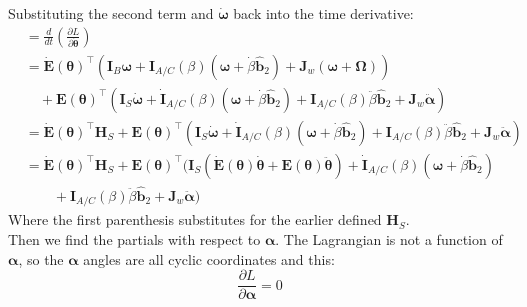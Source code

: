 \documentclass[titlepage]{article}
\begin{document}
Substituting the second term and $\dot{\boldsymbol{\omega}}$ back into the time derivative:
\begin{equation}
	\begin{split}
		&=\frac{d}{dt}\left(\frac{\partial L}{\partial\dot{\boldsymbol{\theta}}}\right) \\
		&=\dot{\boldsymbol{E}}(\boldsymbol{\theta})^\top\left(\boldsymbol{I}_B\boldsymbol{\omega}+\boldsymbol{I}_{A/C}(\beta)\left(\boldsymbol{\omega}+\dot{\beta}\hat{\boldsymbol{b}}_2\right)+\boldsymbol{J}_w\left(\boldsymbol{\omega}+\boldsymbol{\Omega}\right)\right) \\
		&\quad+\boldsymbol{E}(\boldsymbol{\theta})^\top\left(\boldsymbol{I}_S\dot{\boldsymbol{\omega}}+\dot{\boldsymbol{I}}_{A/C}(\beta)\left(\boldsymbol{\omega}+\dot{\beta}\hat{\boldsymbol{b}}_2\right)+\boldsymbol{I}_{A/C}(\beta)\ddot{\beta}\hat{\boldsymbol{b}}_2+\boldsymbol{J}_w\ddot{\boldsymbol{\alpha}}\right) \\
		&=\dot{\boldsymbol{E}}(\boldsymbol{\theta})^\top\boldsymbol{H}_S+\boldsymbol{E}(\boldsymbol{\theta})^\top\left(\boldsymbol{I}_S\dot{\boldsymbol{\omega}}+\dot{\boldsymbol{I}}_{A/C}(\beta)\left(\boldsymbol{\omega}+\dot{\beta}\hat{\boldsymbol{b}}_2\right)+\boldsymbol{I}_{A/C}(\beta)\ddot{\beta}\hat{\boldsymbol{b}}_2+\boldsymbol{J}_w\ddot{\boldsymbol{\alpha}}\right) \\
		&=\dot{\boldsymbol{E}}(\boldsymbol{\theta})^\top\boldsymbol{H}_S+\boldsymbol{E}(\boldsymbol{\theta})^\top\Big(\boldsymbol{I}_S\left(\dot{\boldsymbol{E}}(\boldsymbol{\theta})\dot{\boldsymbol{\theta}}+\boldsymbol{E}(\boldsymbol{\theta})\ddot{\boldsymbol{\theta}}\right)+\dot{\boldsymbol{I}}_{A/C}(\beta)\left(\boldsymbol{\omega}+\dot{\beta}\hat{\boldsymbol{b}}_2\right) \\
		&\qquad+\boldsymbol{I}_{A/C}(\beta)\ddot{\beta}\hat{\boldsymbol{b}}_2+\boldsymbol{J}_w\ddot{\boldsymbol{\alpha}}\Big)
	\end{split}
	\label{eq:thetadotdt}
\end{equation}
Where the first parenthesis substitutes for the earlier defined $\boldsymbol{H}_S$. \\

Then we find the partials with respect to $\boldsymbol{\alpha}$. The Lagrangian is not a function of $\boldsymbol{\alpha}$, so the $\boldsymbol{\alpha}$ angles are all cyclic coordinates and this:
\begin{equation}
	\frac{\partial L}{\partial\boldsymbol{\alpha}}=0
\end{equation}
\end{document}
